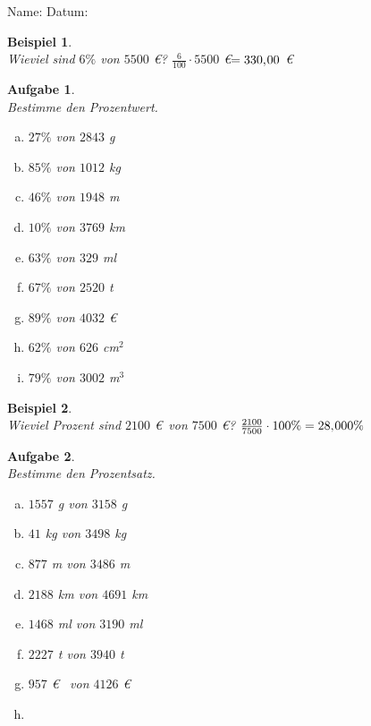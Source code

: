 \documentclass[12pt]{article}
\theoremstyle{aufg}
\newtheorem{aufgabe}{Aufgabe}
\theoremstyle{bsp}
\newtheorem{beispiel}{Beispiel}
\begin{document}
 
    \begin{flushleft}
Name: \hspace{12cm} Datum:\begin{beispiel} ~ \\ 
Wieviel sind $6\%$ von $5500$ \euro? $\frac{6}{100}\cdot 5500$ \euro $ = 330,\hspace{-1pt}00$ \euro\end{beispiel} 
\begin{aufgabe} ~ \\ 
Bestimme den Prozentwert.\begin{multicols}{3} 
\begin{enumerate}[a)] 
\item 
$27\%$ von $2843$ g
\item 
$85\%$ von $1012$ kg
\item 
$46\%$ von $1948$ m
\item 
$10\%$ von $3769$ km
\item 
$63\%$ von $329$ ml
\item 
$67\%$ von $2520$ t
\item 
$89\%$ von $4032$ \euro~
\item 
$62\%$ von $626$ cm$^2$
\item 
$79\%$ von $3002$ m$^3$
\end{enumerate} 
\end{multicols} 
\end{aufgabe} 
\begin{beispiel} ~ \\ 
Wieviel Prozent sind $2100$ \euro~von $7500$ \euro? $\frac{2100}{7500}\cdot 100\%  = 28,\hspace{-1pt}000\%$ \end{beispiel} 
\begin{aufgabe} ~ \\ 
Bestimme den Prozentsatz.\begin{multicols}{3} 
\begin{enumerate}[a)] 
\item 
$1557$ g von $3158$ g
\item 
$41$ kg von $3498$ kg
\item 
$877$ m von $3486$ m
\item 
$2188$ km von $4691$ km
\item 
$1468$ ml von $3190$ ml
\item 
$2227$ t von $3940$ t
\item 
$957$ \euro~ von $4126$ \euro~
\item 

\end{enumerate}
\end{multicols}
\end{aufgabe}
\end{flushleft}
\end{document}
